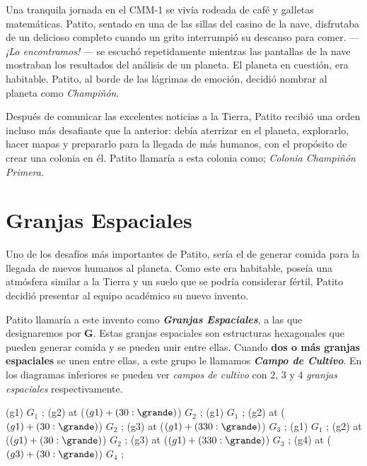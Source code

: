 \noindent Una tranquila jornada en el CMM-1 se vivía rodeada de café y galletas matemáticas. Patito, %
sentado en una de las sillas del casino de la nave, disfrutaba de un delicioso completo cuando un grito interrumpió %
su descanso para comer. --- \emph{¡Lo encontramos!} --- se escuchó repetidamente mientras las pantallas de la nave %
mostraban los resultados del análisis de un planeta. El planeta en cuestión, era habitable. Patito, al borde de las %
lágrimas de emoción, decidió nombrar al planeta como \emph{Champiñón}.

\noindent Después de comunicar las excelentes noticias a la Tierra, Patito recibió una orden incluso más desafiante %
que la anterior: debía aterrizar en el planeta, explorarlo, hacer mapas y prepararlo para la llegada de más humanos, %
con el propósito de crear una colonia en él. Patito llamaría a esta colonia como; \emph{Colonia Champiñón Primera}.

\section*{Granjas Espaciales}

\noindent Uno de los desafíos más importantes de Patito, sería el de generar comida para la llegada de nuevos humanos al %
planeta. Como este era habitable, poseía una atmósfera similar a la Tierra y un suelo que se podría considerar fértil, %
Patito decidió presentar al equipo académico su nuevo invento.

\noindent Patito llamaría a este invento como \textbf{\emph{Granjas Espaciales}}, a las que designaremos por $\mathbf{G}$. %
Estas granjas espaciales son estructuras hexagonales que pueden generar comida y se pueden unir entre ellas. Cuando %
\textbf{dos o más granjas espaciales} se unen entre ellas, a este grupo le llamamos \textbf{\emph{Campo de Cultivo}}. En los %
diagramas inferiores se pueden ver \emph{campos de cultivo} con $2$, $3$ y $4$ \emph{granjas espaciales} respectivamente.

\begin{center}
\cultivos
\granja (g1) {$G_1$} ;
\granja (g2) at ($(g1) + (30:\grande)$) {$G_2$} ;
\finfin
\hspace{20mm}
\cultivos
\granja (g1) {$G_1$} ;
\granja (g2) at ($(g1) + (30:\grande)$) {$G_2$} ;
\granja (g3) at ($(g1) + (330:\grande)$) {$G_3$} ;
\finfin
\hspace{20mm}
\cultivos
\granja (g1) {$G_1$} ;
\granja (g2) at ($(g1) + (30:\grande)$) {$G_2$} ;
\granja (g3) at ($(g1) + (330:\grande)$) {$G_3$} ;
\granja (g4) at ($(g3) + (30:\grande)$) {$G_4$} ;
\finfin
\end{center}

